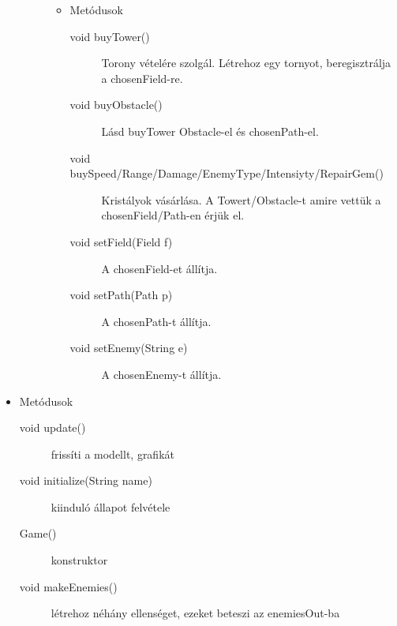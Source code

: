 \begin{itemize}
\begin{description}
\begin{itemize}
\begin{description}
		
	\end{description}
\item Metódusok\\
	\begin{description}
		
		\item[void buyTower()] Torony vételére szolgál. Létrehoz egy tornyot, beregisztrálja a chosenField-re. 
		\item[void buyObstacle()] Lásd buyTower Obstacle-el és chosenPath-el. 
		\item[void buySpeed/Range/Damage/EnemyType/Intensiyty/RepairGem()] Kristályok vásárlása. A Towert/Obstacle-t amire vettük a chosenField/Path-en érjük el. 
		\item[void setField(Field f)] A chosenField-et állítja. 
		\item[void setPath(Path p)] A chosenPath-t állítja. 
		\item[void setEnemy(String e)] A chosenEnemy-t állítja. 
		
		
		
	\end{description}
\end{itemize}

		
	\end{description}
\item Metódusok\\
	\begin{description}
		\item[void update()] frissíti a modellt, grafikát
\item[void initialize(String name)] kiinduló állapot felvétele
\item[Game()] konstruktor
\item[void makeEnemies()] létrehoz néhány ellenséget, ezeket beteszi az enemiesOut-ba

		
		
	\end{description}
\end{itemize}
